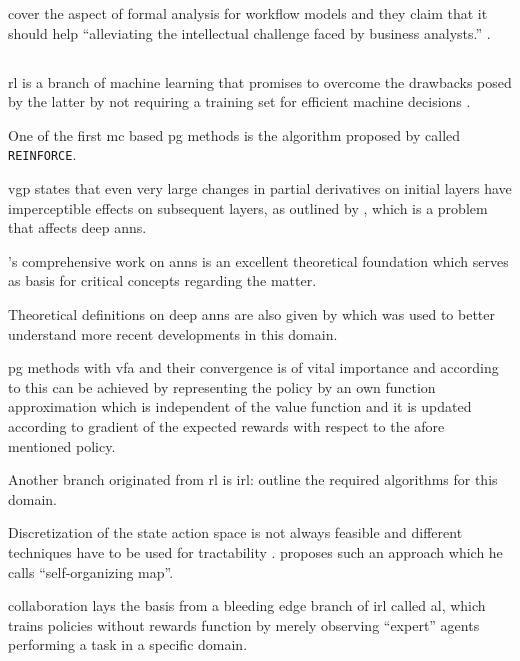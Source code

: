 \documentclass[draft=false]{seal_thesis}
\begin{document}
\citet{Sun2013} cover the aspect of formal analysis for workflow models and they claim that it should help ``alleviating the intellectual challenge faced by business analysts.'' \citep[p. 2]{Sun2013}.

\subsection{}

\gls{rl} is a branch of machine learning that promises to overcome the drawbacks posed by the latter by not requiring a training set for efficient machine decisions \citep{Sutton2017}.

One of the first \gls{mc} based \gls{pg} methods is the algorithm proposed by \citet{Williams1992} called \texttt{REINFORCE}.

\gls{vgp} states that even very large changes in partial derivatives on initial layers have imperceptible effects on subsequent layers, as outlined by \citet{Bengio1994}, which is a problem that affects deep \glspl{ann}.

\citet{Haykin1998}'s comprehensive work on \glspl{ann} is an excellent theoretical foundation which serves as basis for critical concepts regarding the matter.

Theoretical definitions on deep \glspl{ann} are also given by \citet{Lecun1998} which was used to better understand more recent developments in this domain.

\gls{pg} methods with \gls{vfa} and their convergence is of vital importance and according to \citet{Sutton1999} this can be achieved by representing the policy by an own function approximation which is independent of the value function and it is updated according to gradient of the expected rewards with respect to the afore mentioned policy.

Another branch originated from \gls{rl} is \gls{irl}: \citet{Ng2000} outline the required algorithms for this domain.

Discretization of the state action space is not always feasible and different techniques have to be used for tractability \citep{Smith2002}. \citet{Smith2002} proposes such an approach which he calls ``self-organizing map''.

\citet{Abbeel2004} collaboration lays the basis from a bleeding edge branch of \gls{irl} called \gls{al}, which trains policies without rewards function by merely observing ``expert'' agents performing a task in a specific domain.
\end{document}
